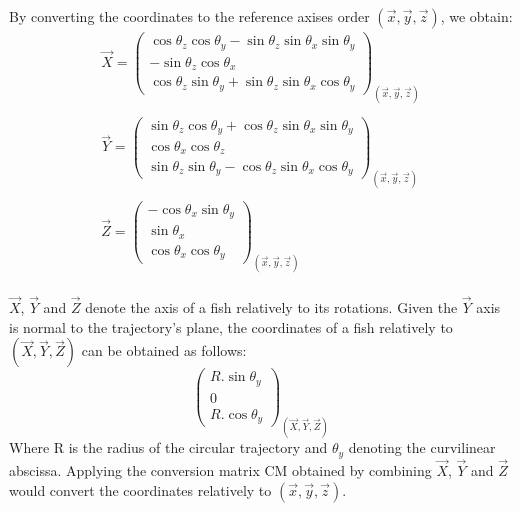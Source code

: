 By converting the coordinates to the reference axises order $(\overrightarrow{x}, \overrightarrow{y}, \overrightarrow{z})$, we obtain:\\

\[
\begin{array}{lllll}
\overrightarrow{X} = \begin{pmatrix}
\cos{\theta_{z}}  \cos{\theta_{y}} - \sin{\theta_{z}}  \sin{\theta_{x}}  \sin{\theta_{y}}\\
-\sin{\theta_{z}}  \cos{\theta_{x}} \\
\cos{\theta_{z}}  \sin{\theta_{y}} + \sin{\theta_{z}}  \sin{\theta_{x}}  \cos{\theta_{y}}
\end{pmatrix}_{(\overrightarrow{x}, \overrightarrow{y}, \overrightarrow{z})}\\ \\

\overrightarrow{Y} = \begin{pmatrix}
\sin{\theta_{z}}  \cos{\theta_{y}} + \cos{\theta_{z}}  \sin{\theta_{x}}  \sin{\theta_{y}}\\
\cos{\theta_{x}}  \cos{\theta_{z}} \\
\sin{\theta_{z}}  \sin{\theta_{y}} - \cos{\theta_{z}}  \sin{\theta_{x}}  \cos{\theta_{y}}
\end{pmatrix}_{(\overrightarrow{x}, \overrightarrow{y}, \overrightarrow{z})}\\ \\

\overrightarrow{Z} = \begin{pmatrix}
-\cos{\theta_{x}}  \sin{\theta_{y}}\\
\sin{\theta_{x}}\\
\cos{\theta_{x}}  \cos{\theta_{y}}
\end{pmatrix}_{(\overrightarrow{x}, \overrightarrow{y}, \overrightarrow{z})}
\end{array}
\]\\

$\overrightarrow{X}$, $\overrightarrow{Y}$ and $\overrightarrow{Z}$ denote the axis of a fish relatively to its rotations. Given the $\overrightarrow{Y}$ axis is normal to the trajectory's plane, the coordinates of a fish relatively to $(\overrightarrow{X}, \overrightarrow{Y}, \overrightarrow{Z})$ can be obtained as follows:
\[
\begin{pmatrix}
R . \sin{\theta_{y}} \\
0 \\
R . \cos{\theta_{y}}
\end{pmatrix}_{(\overrightarrow{X}, \overrightarrow{Y}, \overrightarrow{Z})}
\]
Where R is the radius of the circular trajectory and $\theta_{y}$ denoting the curvilinear abscissa. Applying the conversion matrix CM obtained by combining $\overrightarrow{X}$, $\overrightarrow{Y}$ and $\overrightarrow{Z}$ would convert the coordinates relatively to $(\overrightarrow{x}, \overrightarrow{y}, \overrightarrow{z})$.\\

